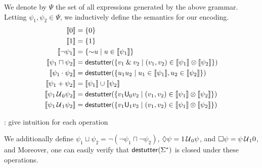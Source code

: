 We denote by $\Psi$ the set of all expressions generated by the above grammar.
Letting $\psi_1, \psi_2 \in \Psi$, we inductively define the semantics for our encoding.
\begin{align*}
		\llbracket 0 \rrbracket &=  \{ 0 \} \\
		\llbracket 1 \rrbracket &=  \{ 1 \} \\
		\llbracket \lnot \psi_1 \rrbracket &= \{ \BitNeg u \st u \in \llbracket \psi_1 \rrbracket \} \\
		\llbracket \psi_1 \sqcap \psi_2 \rrbracket &= \destutter(\{ v_1 \BitAnd v_2 \st (v_1,v_2) \in \llbracket \psi_1 \rrbracket \otimes \llbracket \psi_2 \rrbracket \}) \\
		\llbracket \psi_1 \cdot \psi_2 \rrbracket &= \destutter(\{ u_1 u_2 \st u_1 \in \llbracket \psi_1 \rrbracket, u_2 \in \llbracket \psi_2 \rrbracket \}) \\
		\llbracket \psi_1 + \psi_2 \rrbracket &= \llbracket \psi_1 \rrbracket \cup \llbracket \psi_2 \rrbracket \\
		\llbracket \psi_1 \until_{\!0} \psi_2 \rrbracket &= \destutter(\{ v_1 \mathsf{U}_0 v_2  \st (v_1,v_2) \in \llbracket \psi_1 \rrbracket \otimes \llbracket \psi_2 \rrbracket \}) \\
		\llbracket \psi_1 \until_{\!1} \psi_2 \rrbracket &= \destutter(\{ v_1 \mathsf{U}_1 v_2  \st (v_1,v_2) \in \llbracket \psi_1 \rrbracket \otimes \llbracket \psi_2 \rrbracket \}) \\
\end{align*}

\TODO: give intuition for each operation

We additionally define $\psi_1 \sqcup \psi_2 = \lnot (\lnot \psi_1 \sqcap \lnot \psi_2)$, $\lozenge \psi = 1 \,\mathcal{U}\,_{\!0} \psi$, and $\square \psi = \psi \,\mathcal{U}\,_{\!1} 0$, and 
Moreover, one can easily verify that $\mathsf{destutter}(\Sigma^*)$ is closed under these operations.








